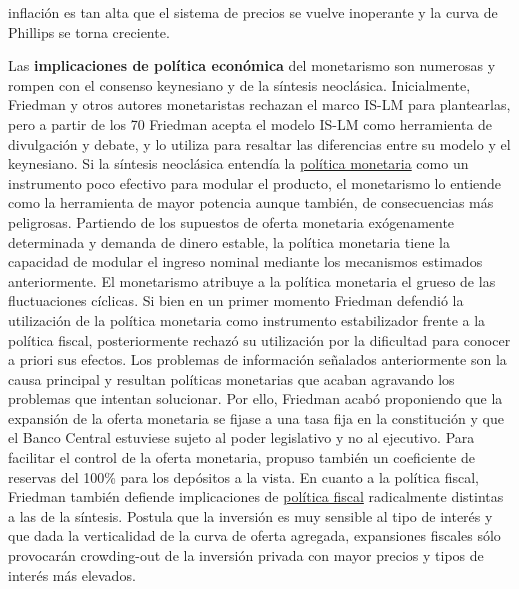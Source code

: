 \documentclass{nuevotema}
\begin{document}
inflación es tan alta que el sistema de precios se vuelve inoperante y la curva de Phillips se torna creciente.

Las \textbf{implicaciones de política económica} del monetarismo son numerosas y rompen con el consenso keynesiano y de la síntesis neoclásica. Inicialmente, Friedman y otros autores monetaristas rechazan el marco IS-LM para plantearlas, pero a partir de los 70 Friedman acepta el modelo IS-LM como herramienta de divulgación y debate, y lo utiliza para resaltar las diferencias entre su modelo y el keynesiano. Si la síntesis neoclásica entendía la \underline{política monetaria} como un instrumento poco efectivo para modular el producto, el monetarismo lo entiende como la herramienta de mayor potencia aunque también, de consecuencias más peligrosas. Partiendo de los supuestos de oferta monetaria exógenamente determinada y demanda de dinero estable, la política monetaria tiene la capacidad de modular el ingreso nominal mediante los mecanismos estimados anteriormente. El monetarismo atribuye a la política monetaria el grueso de las fluctuaciones cíclicas. Si bien en un primer momento Friedman defendió la utilización de la política monetaria como instrumento estabilizador frente a la política fiscal, posteriormente rechazó su utilización por la dificultad para conocer a priori sus efectos. Los problemas de información señalados anteriormente son la causa principal y resultan políticas monetarias que acaban agravando los problemas que intentan solucionar. Por ello, Friedman acabó proponiendo que la expansión de la oferta monetaria se fijase a una tasa fija en la constitución y que el Banco Central estuviese sujeto al poder legislativo y no al ejecutivo. Para facilitar el control de la oferta monetaria, propuso también un coeficiente de reservas del 100\% para los depósitos a la vista. En cuanto a la política fiscal, Friedman también defiende implicaciones de \underline{política fiscal} radicalmente distintas a las de la síntesis. Postula que la inversión es muy sensible al tipo de interés y que dada la verticalidad de la curva de oferta agregada, expansiones fiscales sólo provocarán crowding-out de la inversión privada con mayor precios y tipos de interés más elevados. 
\end{document}
